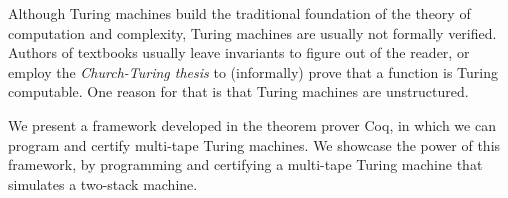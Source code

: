 Although Turing machines build the traditional foundation of the theory of computation and complexity, Turing machines are usually not formally
verified.  Authors of textbooks usually leave invariants to figure out of the reader, or employ the \textit{Church-Turing thesis} to (informally)
prove that a function is Turing computable.  One reason for that is that Turing machines are unstructured.

We present a framework developed in the theorem prover Coq, in which we can program and certify multi-tape Turing machines.  We showcase the power of
this framework, by programming and certifying a multi-tape Turing machine that simulates a two-stack machine.


